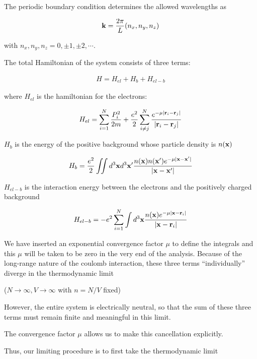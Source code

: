 The periodic boundary condition determines the allowed wavelengths as

\begin{align}
{\bf k} = \frac{2\pi}{L}(n_x,n_y,n_z)
\end{align}

with $n_x,n_y,n_z = 0,\pm1,\pm2,\cdots$.

The total Hamiltonian of the system consists of three terms:

\begin{align}
H = H_{el}+H_b+H_{el-b}
\end{align}

where $H_{el}$ is the hamiltonian for the electrons:

\begin{align}
H_{el} = \sum_{i=1}^N\frac{P_i^2}{2m}+\frac{e^2}{2}\sum_{i\neq j}^N\frac{e^{-\mu|{\bf r}_i - {\bf r}_j|}}{|{\bf r}_i - {\bf r}_j|}
\end{align}

$H_b$ is the energy of the positive background whose particle density is $n(\bf x)$

\begin{align}
H_b = \frac{e^2}{2}\iint d^3{\bf x}d^3{\bf x'}\frac{n({\bf x})n({\bf x'})e^{-\mu|\bf x-x'|}}{|\bf x-x'|}
\end{align}

$H_{el-b}$ is the interaction energy between the electrons and the positively charged background

\begin{align}
H_{el-b} = -e^2\sum_{i=1}^N\int d^3{\bf x}\frac{n({\bf x})e^{-\mu|{\bf x-r}_i|}}{|{\bf x - r}_i|}
\end{align}

We have inserted an exponential convergence factor $\mu$ to define the integrals and this $\mu$ will be taken to be zero in the very end of the analysis. Because of the long-range nature of the coulomb interaction, these three terms ``individually'' diverge in the thermodynamic limit

($N\rightarrow\infty, V\rightarrow\infty$ with $n = N/V$ fixed)

However, the entire system is electrically neutral, so that the sum of these three terms must remain finite and meaningful in this limit. 

The convergence factor $\mu$ allows us to make this cancellation explicitly. 

Thus, our limiting procedure is to first take the thermodynamic limit 

